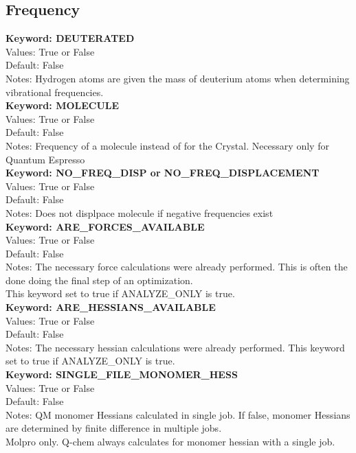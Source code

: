 \documentclass[11pt,letterpaper]{article}
\begin{document}
\begin{spacing}{1.0}
\subsection{Frequency}

\noindent
\textbf{Keyword: DEUTERATED} \\
Values: True or False\\
Default: False\\
Notes: Hydrogen atoms are given the mass of deuterium atoms when determining vibrational frequencies. \\

\noindent
\textbf{Keyword: MOLECULE} \\
Values: True or False\\
Default: False\\
Notes: Frequency of a molecule instead of for the Crystal. Necessary only for Quantum Espresso\\

\noindent
\textbf{Keyword: NO\_FREQ\_DISP or NO\_FREQ\_DISPLACEMENT} \\
Values: True or False\\
Default: False\\
Notes: Does not displpace molecule if negative frequencies exist\\

\noindent
\textbf{Keyword: ARE\_FORCES\_AVAILABLE} \\
Values: True or False\\
Default: False\\
Notes: The necessary force calculations 
were already  performed. This is often the done doing the final step of an optimization.\\
 This keyword set to true if ANALYZE\_ONLY is true.\\

\noindent
\textbf{Keyword: ARE\_HESSIANS\_AVAILABLE} \\
Values: True or False\\
Default: False\\
Notes: The necessary hessian calculations
were already  performed. This keyword set to true if ANALYZE\_ONLY is true.\\

\noindent
\textbf{Keyword: SINGLE\_FILE\_MONOMER\_HESS} \\
Values: True or False\\
Default: False\\
Notes: QM monomer Hessians calculated in single job. If false, monomer
           Hessians are determined by finite difference in multiple jobs.\\
           Molpro only. Q-chem always calculates for monomer hessian with
           a single job.\\


\end{spacing}
\end{document}
